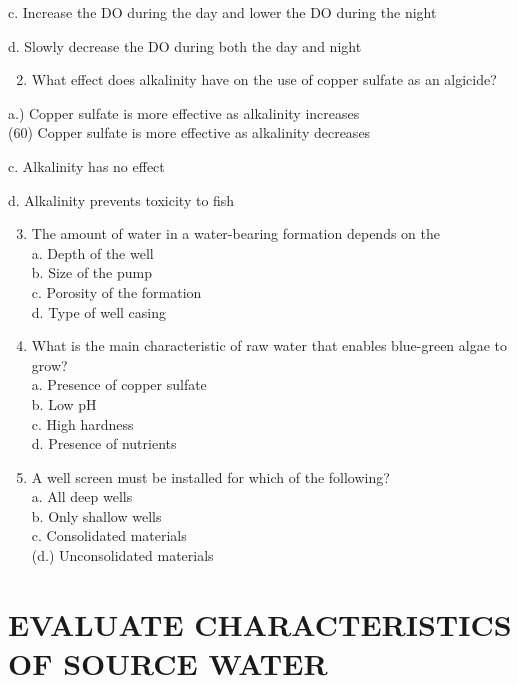 \documentclass[10pt]{article}
\begin{document}
c. Increase the DO during the day and lower the DO during the night

d. Slowly decrease the DO during both the day and night

\begin{enumerate}
  \setcounter{enumi}{1}
  \item What effect does alkalinity have on the use of copper sulfate as an algicide?
\end{enumerate}

a.) Copper sulfate is more effective as alkalinity increases\\
(60) Copper sulfate is more effective as alkalinity decreases

c. Alkalinity has no effect

d. Alkalinity prevents toxicity to fish

\begin{enumerate}
  \setcounter{enumi}{2}
  \item The amount of water in a water-bearing formation depends on the\\
a. Depth of the well\\
b. Size of the pump\\
c. Porosity of the formation\\
d. Type of well casing

  \item What is the main characteristic of raw water that enables blue-green algae to grow?\\
a. Presence of copper sulfate\\
b. Low $\mathrm{pH}$\\
c. High hardness\\
d. Presence of nutrients

  \item A well screen must be installed for which of the following?\\
a. All deep wells\\
b. Only shallow wells\\
c. Consolidated materials\\
(d.) Unconsolidated materials

\end{enumerate}

\section{EVALUATE CHARACTERISTICS OF SOURCE WATER}
\end{document}
